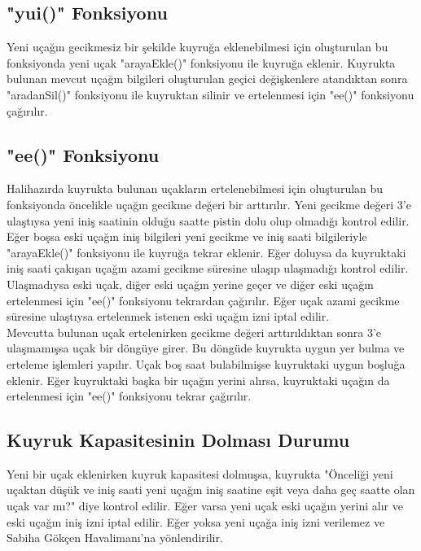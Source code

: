 \documentclass[conference]{IEEEtran}
\begin{document}
\subsection{"yui()" Fonksiyonu}
Yeni uçağın gecikmesiz bir şekilde kuyruğa eklenebilmesi için oluşturulan bu 
fonksiyonda yeni uçak "arayaEkle()" fonksiyonu ile kuyruğa eklenir. Kuyrukta 
bulunan mevcut uçağın bilgileri oluşturulan geçici değişkenlere atandıktan sonra
"aradanSil()" fonksiyonu ile kuyruktan silinir ve ertelenmesi için "ee()" 
fonksiyonu çağırılır.\\

\subsection{"ee()" Fonksiyonu}
Halihazırda kuyrukta bulunan uçakların ertelenebilmesi için oluşturulan bu 
fonksiyonda öncelikle uçağın gecikme değeri bir arttırılır. Yeni gecikme değeri 
3'e ulaştıysa yeni iniş saatinin olduğu saatte pistin dolu olup olmadığı kontrol
edilir. Eğer boşsa eski uçağın iniş bilgileri yeni gecikme ve iniş saati 
bilgileriyle "arayaEkle()" fonksiyonu ile kuyruğa tekrar eklenir. Eğer doluysa 
da kuyruktaki iniş saati çakışan uçağın azami gecikme süresine ulaşıp ulaşmadığı
kontrol edilir. Ulaşmadıysa eski uçak, diğer eski uçağın yerine geçer ve diğer 
eski uçağın ertelenmesi için "ee()" fonksiyonu tekrardan çağırılır. Eğer uçak 
azami gecikme süresine ulaştıysa ertelenmek istenen eski uçağın izni iptal 
edilir.\\

Mevcutta bulunan uçak ertelenirken gecikme değeri arttırıldıktan sonra 3'e 
ulaşmamışsa uçak bir döngüye girer. Bu döngüde kuyrukta uygun yer bulma ve 
erteleme işlemleri yapılır. Uçak boş saat bulabilmişse kuyruktaki uygun boşluğa 
eklenir. Eğer kuyruktaki başka bir uçağın yerini alırsa, kuyruktaki uçağın da 
ertelenmesi için "ee()" fonksiyonu tekrar çağırılır.\\

\subsection{Kuyruk Kapasitesinin Dolması Durumu}
Yeni bir uçak eklenirken kuyruk kapasitesi dolmuşsa, kuyrukta "Önceliği yeni 
uçaktan düşük ve iniş saati yeni uçağın iniş saatine eşit veya daha geç saatte 
olan uçak var mı?" diye kontrol edilir. Eğer varsa yeni uçak eski uçağın yerini 
alır ve eski uçağın iniş izni iptal edilir. Eğer yoksa yeni uçağa iniş izni 
verilemez ve Sabiha Gökçen Havalimanı'na yönlendirilir.\\
\end{document}
